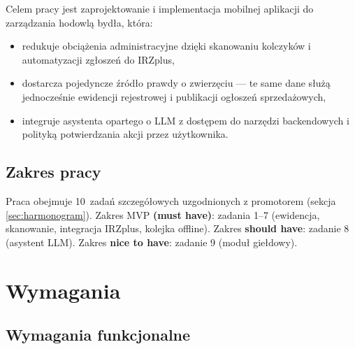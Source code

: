 \documentclass[11pt,a4paper]{article}
\begin{document}
Celem pracy jest zaprojektowanie i implementacja mobilnej aplikacji do zarządzania hodowlą bydła, która:

\begin{itemize}
  \item redukuje obciążenia administracyjne dzięki skanowaniu kolczyków i automatyzacji zgłoszeń do IRZplus,
  \item dostarcza pojedyncze źródło prawdy o zwierzęciu --- te same dane służą jednocześnie ewidencji rejestrowej i publikacji ogłoszeń sprzedażowych,
  \item integruje asystenta opartego o LLM z dostępem do narzędzi backendowych i polityką potwierdzania akcji przez użytkownika.
\end{itemize}

\subsection{Zakres pracy}

Praca obejmuje 10~zadań szczegółowych uzgodnionych z promotorem (sekcja \ref{sec:harmonogram}). Zakres MVP \textbf{(must have)}: zadania 1--7 (ewidencja, skanowanie, integracja IRZplus, kolejka offline). Zakres \textbf{should have}: zadanie 8 (asystent LLM). Zakres \textbf{nice to have}: zadanie 9 (moduł giełdowy).

\section{Wymagania}

\subsection{Wymagania funkcjonalne}
\end{document}
